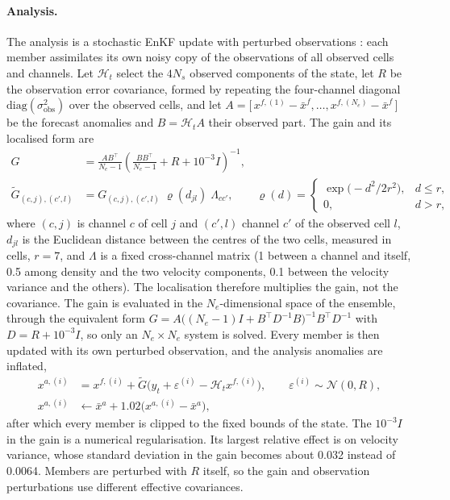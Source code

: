 \documentclass[english, 12pt, a4paper, elec, utf8, a-2b, online]{aaltothesis}
\begin{document}
\paragraph{Analysis.}
The analysis is a stochastic EnKF update with perturbed observations
\cite{burgers1998enkf, roth2017enkf}: each member assimilates its own noisy copy of the
observations of all observed cells and channels. Let $\mathcal{H}_t$ select the
$4 N_s$ observed components of the state, let $R$ be the observation error
covariance, formed by repeating the four-channel diagonal
$\mathrm{diag}(\sigma^2_{\mathrm{obs}})$ over the observed cells, and let
$A = \big[\, x^{f,(1)} - \bar{x}^f, \dots, x^{f,(N_e)} - \bar{x}^f \,\big]$ be
the forecast anomalies and $B = \mathcal{H}_t A$ their observed part. The gain and its
localised form are
\begin{equation}
	\begin{aligned}
	G &= \frac{A B^{\top}}{N_e - 1} \left( \frac{B B^{\top}}{N_e - 1} + R + 10^{-3} I \right)^{-1}, \\
	\tilde{G}_{(c, j), (c', l)} &= G_{(c, j), (c', l)}\; \varrho(d_{jl})\; \Lambda_{c c'},
	\qquad
	\varrho(d) = \begin{cases} \exp\!\big(-d^2 / 2 r^2\big), & d \le r, \\ 0, & d > r, \end{cases}
	\end{aligned}
	\label{eq:enkf_gain}
\end{equation}
where $(c, j)$ is channel $c$ of cell $j$ and $(c', l)$ channel $c'$ of the
observed cell $l$, $d_{jl}$ is the Euclidean distance between the centres of
the two cells, measured in cells, $r = 7$, and $\Lambda$ is a fixed cross-channel matrix (1
between a channel and itself, 0.5 among density and the two velocity
components, 0.1 between the velocity variance and the others). The
localisation therefore multiplies the gain, not the covariance. The gain is
evaluated in the $N_e$-dimensional space of the ensemble, through the
equivalent form $G = A \big( (N_e - 1) I + B^{\top} D^{-1} B \big)^{-1}
B^{\top} D^{-1}$ with $D = R + 10^{-3} I$, so only an $N_e \times N_e$ system
is solved. Every member is then updated with its own perturbed observation, and
the analysis anomalies are inflated,
\begin{equation}
	\begin{aligned}
	x^{a,(i)} &= x^{f,(i)} + \tilde{G} \big( y_t + \varepsilon^{(i)} - \mathcal{H}_t x^{f,(i)} \big),
	\qquad \varepsilon^{(i)} \sim \mathcal{N}(0, R), \\
	x^{a,(i)} &\leftarrow \bar{x}^a + 1.02 \big( x^{a,(i)} - \bar{x}^a \big),
	\end{aligned}
	\label{eq:enkf_update}
\end{equation}
after which every member is clipped to the fixed bounds of the state. The
$10^{-3} I$ in the gain is a numerical regularisation. Its largest relative
effect is on velocity variance, whose standard deviation in the gain becomes
about 0.032 instead of 0.0064. Members are perturbed with $R$ itself, so the
gain and observation perturbations use different effective covariances.
\end{document}
